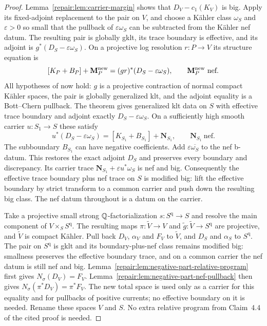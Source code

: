 \begin{proof}
Lemma~\ref{repair:lem:carrier-margin} shows that
$D_V-c_1(K_V)$ is big. Apply its fixed-adjoint replacement to the
pair on $V$, and choose a K\"ahler class $\omega_S$ and
$\varepsilon>0$ so small that the pullback of
$\varepsilon\omega_S$ can be subtracted from the K\"ahler nef
datum. The resulting pair is globally gklt, its trace boundary is
effective, and its adjoint is
$g^*(D_S-\varepsilon\omega_S)$. On a projective log resolution
$r:P\to V$ its structure equation is
\[
 [K_P+B_P]+\mathbf M_P^{\rm new}
             =(gr)^*(D_S-\varepsilon\omega_S),
 \qquad \mathbf M_P^{\rm new}\ \text{nef}.
\]
All hypotheses of \cite[Theorem~2.3]{HP2024} now hold: $g$ is a
projective contraction of normal compact K\"ahler spaces, the pair
is globally generalized klt, and the adjoint equality is a
Bott--Chern pullback. The theorem gives generalized klt data on
$S$ with effective trace boundary and adjoint exactly
$D_S-\varepsilon\omega_S$. On a sufficiently high smooth
carrier $u:S_1\to S$ these satisfy
\[
 u^*(D_S-\varepsilon\omega_S)
            =[K_{S_1}+B_{S_1}]+\mathbf N_{S_1},
 \qquad \mathbf N_{S_1}\ \text{nef}.
\]
The subboundary $B_{S_1}$ can have negative coefficients.
Add $\varepsilon\overline{\omega_S}$ to the nef b-datum.
This restores the exact adjoint $D_S$ and preserves every boundary
and discrepancy. Its carrier trace
$\mathbf N_{S_1}+\varepsilon u^*\omega_S$ is nef and big.
Consequently the effective trace boundary plus nef trace on $S$
is modified big: lift the effective boundary by strict transform
to a common carrier and push down the resulting big class.
The nef datum throughout is a datum on the carrier.

Take a projective small strong $\mathbb Q$-factorialization
$s:S^{\mathrm q}\to S$ and resolve the main component of $V\times_S S^{\mathrm q}$.
The resulting maps $\pi:\widetilde V\to V$ and
$\widetilde g:\widetilde V\to S^{\mathrm q}$ are projective,
and $\widetilde V$ is compact K\"ahler. Pull back $D_V$,
$\alpha_V$ and $F_V$ to $\widetilde V$, and $D_S$ and
$\alpha_S$ to $S^{\mathrm q}$. The pair on $S^{\mathrm q}$ is
gklt and its boundary-plus-nef class remains modified big: smallness
preserves the effective boundary trace, and on a common carrier
the nef datum is still nef and big.
Lemma~\ref{repair:lem:negative-part-relative-program} first gives
$N_\sigma(D_V)=F_V$. Lemma~\ref{repair:lem:negative-part-nef-pullback} then gives
$N_\sigma(\pi^*D_V)=\pi^*F_V$. The new total space is used only as a
carrier for this equality and for pullbacks of positive currents;
no effective boundary on it is needed. Rename these spaces $V$
and $S$. No extra relative program from Claim~4.4 of the cited proof is needed.


\end{proof}
